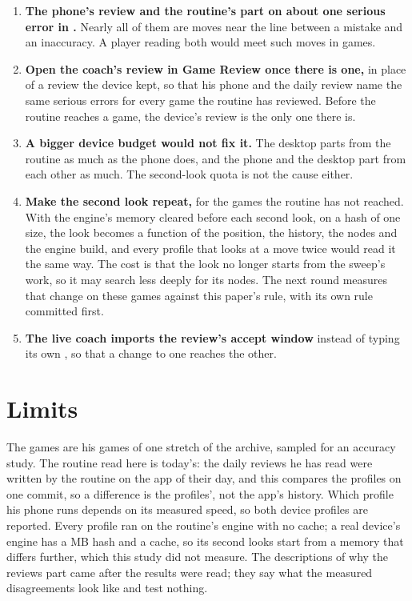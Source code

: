 \documentclass[11pt]{article}
\begin{document}
\begin{enumerate}[leftmargin=*]
\item \textbf{The phone's review and the routine's part on about one serious error in
\PhoneOneIn.} Nearly all of them are moves near the line between a mistake and an inaccuracy. A
player reading both would meet \PhoneDisagree{} such moves in \Cases{} games.
\item \textbf{Open the coach's review in Game Review once there is one,} in place of a review the
device kept, so that his phone and the daily review name the same serious errors for every game the
routine has reviewed. Before the routine reaches a game, the device's review is the only one there
is.
\item \textbf{A bigger device budget would not fix it.} The desktop parts from the routine as much
as the phone does, and the phone and the desktop part from each other as much. The second-look quota
is not the cause either.
\item \textbf{Make the second look repeat,} for the games the routine has not reached. With the
engine's memory cleared before each second look, on a hash of one size, the look becomes a function
of the position, the history, the nodes and the engine build, and every profile that looks at a move
twice would read it the same way. The cost is that the look no longer
starts from the sweep's work, so it may search less deeply for its nodes. The next round measures
that change on these \Cases{} games against this paper's rule, with its own rule committed first.
\item \textbf{The live coach imports the review's accept window} instead of typing its own
\AcceptWindow, so that a change to one reaches the other.
\end{enumerate}

\section{Limits}

The \Cases{} games are his games of one stretch of the archive, sampled for an accuracy study. The routine
read here is today's: the daily reviews he has read were written by the routine on the app of their
day, and this compares the profiles on one commit, so a difference is the profiles', not the app's
history. Which profile his phone runs depends on its measured speed, so both device profiles are
reported. Every profile ran on the routine's engine with no cache; a real device's engine has a
\DeviceHash{} MB hash and a cache, so its second looks start from a memory that differs further,
which this study did not measure. The descriptions of why the reviews part came after the results
were read; they say what the measured disagreements look like and test nothing.
\end{document}
